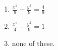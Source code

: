 \documentclass[12pt]{article}
\begin{document}
\begin{enumerate}
\begin{enumerate}
	\item  $\frac{x^2}{9}-\frac{y^2}{9}=\frac{4}{9}$
	\item  $\frac{x^2}{4}-\frac{y^2}{9}=1$
\item  none of these.
\end{enumerate}
\end{enumerate}
\end{document}
